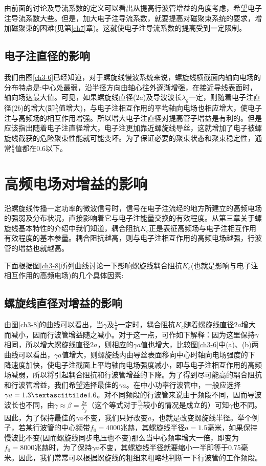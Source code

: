   由前面的讨论及导流系数的定义可以看出从提高行波管增益的角度考虑，希望电子注导流系数大些。但是，加大电子注导流系数，就要提高对磁聚束系统的要求，增加磁聚束的困难(见第\ref{ch7}章)。这就使电子注导流系数的提高受到一定限制。
	\subsection{电子注直径的影响}	
	我们由图\ref{ch3-6}已经知道，对于螺旋线慢波系统来说，螺旋线横截面内轴向电场的分布特点是:中心处最弱，沿半径方向由轴心往外逐渐增强，在接近导线表面时，轴向场达最大值。可见，如果螺旋线直径($ 2a $)及导波波长$ \lambda_g $一定，则随着电子注直径($ 2b $)的增大(即$ \frac{b}{a} $值增大)，与电子注相互作用的平均轴向电场也相应增大，使电子注与高频场的相互作用增强。所以增大电子注直径对提高管子增益是有利的。但是应该指出随着电子注直径增大，电子注更加靠近螺旋线导丝，这就增加了电子被螺旋线截获的危险聚束性能就可能变坏。为了保证必要的聚束状态和聚束稳定性，通常$ \frac{b}{a} $值都在0.6以下。




\section{高频电场对增益的影响}
沿螺旋线传播一定功率的微波信号时，信号在电子注流经的地方所建立的高频电场的强弱及分布状况，直接影响着它与电子注能量交换的有效程度。从第三章关于螺旋线基本特性的介绍中我们知道，耦合阻抗$ K_c $正是表征高频场与电子注相互作用有效程度的基本参量。耦合阻抗越高，则与电子注相互作用的高频电场越强，行波管的增益也就越高。


下面根据图\ref{ch3-8}所列曲线讨论一下影响螺旋线耦合阻抗$ K_c $(也就是影响与电子注相互作用的高频电场)的几个具体因素:
 \subsection{螺旋线直径对增益的影响}
	
	由图\ref{ch3-8}的曲线可以看出，当$ \gamma $及$ \frac{b}{a} $一定时，耦合阻抗$ K_c $随着螺旋线直径$ 2a $增大而减小，因而行波管增益随之减小。对于这一点，可作如下解释：因为这里保持$ \gamma $相同，所以增大螺旋线直径$ 2a $，则相应的$ \gamma a $值也增大，比较图\ref{ch3-6}中(a)、(b)两曲线可以看出，$ \gamma a $值增大，则螺旋线内由导丝表面移向中心时轴向电场强度的下降速度加快，使电子注截面上平均轴向电场强度减小，即与电子注相互作用的高频场减弱，所以将引起耦合阻抗和行波管增益的下降。为了得到尽可能高的耦合阻抗和行波管增益，我们希望选择最佳的$ \gamma a $。在中小功率行波管中，一般应选择$ \gamma a=1.3\textasciitilde1.6 $。对不同频段的行波管来说由于频段不同，因而导波波长也不同，由$ \gamma \approx \beta = \frac{2\pi}{\lambda_g} $（这个等式对于$ \frac{v_p}{c} $较小的情况是成立的）可知$ \gamma $也不同。因此，为了保持最佳的$ \gamma a $不变，我们只好改变$ a $，也就是改变螺旋线半径。举个例子，若某行波管的中心频带$ f_0 = 4000 $兆赫，其螺旋线半径$ a=1.5 $毫米，如果保持慢波比不变(因而螺旋线同步电压也不变)那么当中心频率增大一倍，即变为$ f_0=8000 $兆赫时，为了保持$ \gamma a $不变，其螺旋线半径就要缩小一半即等于0.75毫米。因此，我们常常可以根据螺旋线的粗细来粗略地判断一下行波管的工作频段。


